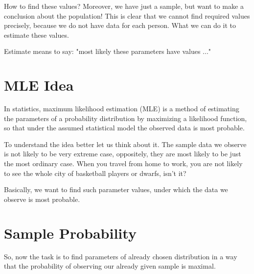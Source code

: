 \documentclass{article}
\begin{document}
How to find these values? Moreover, we have just a sample, but want to make a conclusion about the population! This is clear that we cannot find required values precisely, because we do not have data for each person. What we can do it to estimate these values.

Estimate means to say: "most likely these parameters have values ..."

\section{MLE Idea}
In statistics, maximum likelihood estimation (MLE) is a method of estimating the parameters of a probability distribution by maximizing a likelihood function, so that under the assumed statistical model the observed data is most probable.

To understand the idea better let us think about it. The sample data we observe is not likely to be very extreme case, oppositely, they are most likely to be just the most ordinary case. When you travel from home to work, you are not likely to see the whole city of basketball players or dwarfs, isn't it? 

Basically, we want to find such parameter values, under which the data we observe is most probable.
\section{Sample Probability}

So, now the task is to find parameters of already chosen distribution in a way that the probability of observing our already given sample is maximal.
\end{document}
